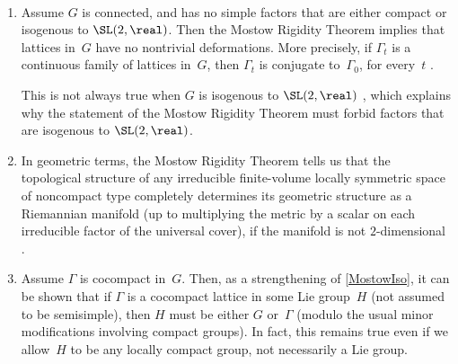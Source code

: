 \begin{rems}  \ \label{MostowRems}
\noprelistbreak
	\begin{enumerate}

	\item \label{MostowRems-deformationrigidity}
	Assume $G$ is connected, and has no simple factors that are either compact or isogenous to $\SL(2,\real)$. Then the Mostow Rigidity Theorem implies that lattices in~$G$ have no nontrivial deformations. More precisely, if $\Gamma_t$ is a continuous family of lattices in~$G$, then $\Gamma_t$ is conjugate to~$\Gamma_0$, for every~$t$ . 

This is not always true when $G$ is isogenous to $\SL(2,\real)$ , which explains why the statement of the Mostow Rigidity Theorem must forbid factors that are isogenous to $\SL(2,\real)$.

	\item In geometric terms, the Mostow Rigidity Theorem tells us that the topological structure of any irreducible finite-volume locally symmetric space of noncompact type completely determines its geometric structure as a Riemannian manifold (up to multiplying the metric by a scalar on each irreducible factor of the universal cover), if the manifold is not $2$-dimensional .


	\item \label{MostowRems-FurmanRigidity}
%
	Assume $\Gamma$ is cocompact in~$G$. Then, as a strengthening of \cref{MostowIso}, it can be shown that if $\Gamma$ is a cocompact lattice in some Lie group~$H$ (not assumed to be semisimple), then $H$ must be either $G$ or~$\Gamma$ (modulo the usual minor modifications involving compact groups). In fact, this remains true even if we allow~$H$ to be any locally compact group, not necessarily a Lie group.

	\end{enumerate}
\end{rems}



